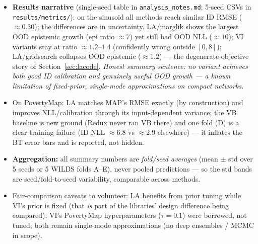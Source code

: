 \documentclass[10pt,a4paper]{article}
\newcommand{\code}[1]{\texttt{#1}}
\begin{document}
\begin{itemize}
\item \textbf{Results narrative} (single-seed table in \code{analysis\_notes.md}; 5-seed CSVs in
  \code{results/metrics/}): on the sinusoid all methods reach similar ID RMSE
  ($\approx0.30$); the differences are in uncertainty. LA/marglik shows the largest OOD epistemic
  growth (epi ratio $\approx7$) yet still bad OOD NLL ($\approx10$); VI variants stay at ratio
  $\approx1.2$--$1.4$ (confidently wrong outside $[0,8]$); LA/gridsearch collapses OOD epistemic
  ($\approx1.2$) --- the degenerate-objective story of Section~\ref{sec:lacode}.
  \emph{Honest summary sentence: no variant achieves both good ID calibration and genuinely useful
  OOD growth --- a known limitation of fixed-prior, single-mode approximations on compact
  networks.}
\item On PovertyMap: LA matches MAP's RMSE exactly (by construction) and improves NLL/calibration
  through its input-dependent variance; the VB baseline is new ground (Redux never ran VB there)
  and one fold (D) is a clear training failure (ID NLL $\approx6.8$ vs $\approx2.9$ elsewhere) ---
  it inflates the BT error bars and is reported, not hidden.
\item \textbf{Aggregation:} all summary numbers are \emph{fold/seed averages} (mean $\pm$ std over
  5 seeds or 5 WILDS folds A--E), never pooled predictions --- so the std bands are
  seed/fold-to-seed variability, comparable across methods.
\item Fair-comparison caveats to volunteer: LA benefits from prior tuning while VI's prior is
  fixed (that \emph{is} part of the libraries' design difference being compared); VI's PovertyMap
  hyperparameters ($\tau{=}0.1$) were borrowed, not tuned; both remain single-mode approximations
  (no deep ensembles / MCMC in scope).
\end{itemize}

\end{document}
